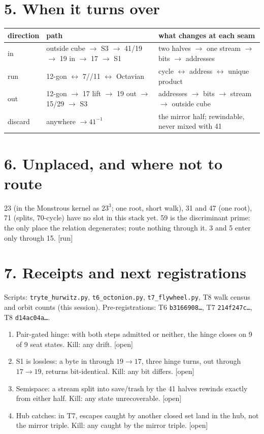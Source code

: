 \documentclass[11pt,a4paper]{article}
\newcommand{\stamp}[1]{\textsf{\small[#1]}}
\begin{document}
\section*{5. When it turns over}
\begin{center}\small
\begin{tabular}{@{}lll@{}}\toprule
direction & path & what changes at each seam\\\midrule
in & outside cube $\to$ S3 $\to$ 41/19 $\to$ 19 in $\to$ 17 $\to$ S1 & two halves $\to$ one stream $\to$ bits $\to$ addresses\\
run & 12-gon $\leftrightarrow$ 7//11 $\leftrightarrow$ Octavian & cycle $\leftrightarrow$ address $\leftrightarrow$ unique product\\
out & 12-gon $\to$ 17 lift $\to$ 19 out $\to$ 15/29 $\to$ S3 & addresses $\to$ bits $\to$ stream $\to$ outside cube\\
discard & anywhere $\to 41^{-1}$ & the mirror half; rewindable, never mixed with 41\\\bottomrule
\end{tabular}
\end{center}

\section*{6. Unplaced, and where not to route}
23 (in the Monstrous kernel as $23^3$; one root, short walk), 31 and 47 (one root), 71 (splits, 70-cycle) have no slot in this stack yet. 59 is the discriminant prime: the only place the relation degenerates; route nothing through it. 3 and 5 enter only through 15. \stamp{run}

\section*{7. Receipts and next registrations}
Scripts: \texttt{tryte\_hurwitz.py}, \texttt{t6\_octonion.py}, \texttt{t7\_flywheel.py}, T8 walk census and orbit counts (this session). Pre-registrations: T6 \texttt{b3166908\ldots}, T7 \texttt{214f247c\ldots}, T8 \texttt{d14ac04a\ldots}.
\begin{enumerate}[leftmargin=2em]
\item Pair-gated hinge: with both steps admitted or neither, the hinge closes on 9 of 9 seat states. Kill: any drift. \stamp{open}
\item S1 is lossless: a byte in through $19\to17$, three hinge turns, out through $17\to19$, returns bit-identical. Kill: any bit differs. \stamp{open}
\item Semispace: a stream split into save/trash by the 41 halves rewinds exactly from either half. Kill: any state unrecoverable. \stamp{open}
\item Hub catches: in T7, escapes caught by another closed set land in the hub, not the mirror triple. Kill: any caught by the mirror triple. \stamp{open}
\end{enumerate}
\end{document}
